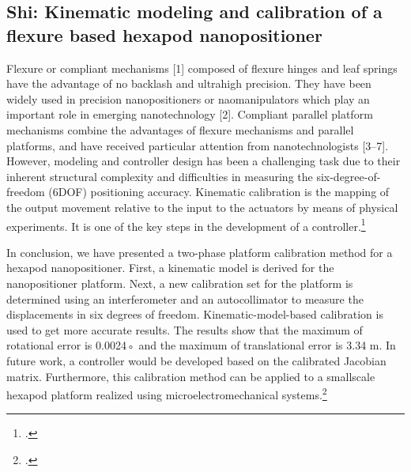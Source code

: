 \subsection{Shi: Kinematic modeling and calibration of a flexure based hexapod nanopositioner}
Flexure or compliant mechanisms [1] composed of flexure
hinges and leaf springs have the advantage of no backlash and
ultrahigh precision. They have been widely used in precision
nanopositioners or naomanipulators which play an important
role in emerging nanotechnology [2]. Compliant parallel platform
mechanisms combine the advantages of flexure mechanisms and
parallel platforms, and have received particular attention from nanotechnologists [3–7]. However, modeling and controller design has
been a challenging task due to their inherent structural complexity and difficulties in measuring the six-degree-of-freedom (6DOF)
positioning accuracy.
Kinematic calibration is the mapping of the output movement
relative to the input to the actuators by means of physical experiments. It is one of the key steps in the development of a controller.\footcite[Vgl.][117]{Shi2013} 

In conclusion, we have presented a two-phase platform calibration method for a hexapod nanopositioner. First, a kinematic
model is derived for the nanopositioner platform. Next, a new
calibration set for the platform is determined using an interferometer and an autocollimator to measure the displacements
in six degrees of freedom. Kinematic-model-based calibration
is used to get more accurate results. The results show that
the maximum of rotational error is 0.0024◦ and the maximum
of translational error is 3.34 m. In future work, a controller
would be developed based on the calibrated Jacobian matrix.
Furthermore, this calibration method can be applied to a smallscale hexapod platform realized using microelectromechanical
systems.\footcite[Vgl.][124]{Shi2013}


